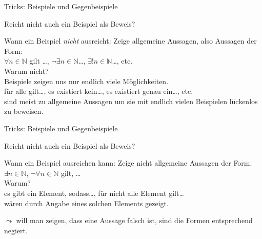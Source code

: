 \begin{frame}[fragile]{Tricks: Beispiele und Gegenbeispiele}
	\begin{alertblock}{Reicht nicht auch ein Beispiel als Beweis?}
	\end{alertblock}
	\begin{block}{Wann ein Beispiel \emph{nicht} ausreicht:}
		Zeige allgemeine Aussagen, also Aussagen der Form:\\$\forall n\in\mathbb{N}$ gilt \dots, $\neg\exists n\in\mathbb{N}$\dots, $\exists!n\in\mathbb{N}$\dots, etc.\\
		\alert{Warum nicht?}\\
		Beispiele zeigen uns nur endlich viele Möglichkeiten.\\
		\glqq für alle gilt\dots\grqq, \glqq es existiert kein\dots\grqq, \glqq es existiert genau ein\dots\grqq, etc. \\sind meist zu allgemeine Aussagen um sie mit endlich vielen Beispielen lückenlos zu beweisen.
	\end{block}
\end{frame}

\begin{frame}[fragile]{Tricks: Beispiele und Gegenbeispiele}
	\begin{alertblock}{Reicht nicht auch ein Beispiel als Beweis?}
	\end{alertblock}
	\begin{block}{Wann ein Beispiel ausreichen kann:}
		Zeige nicht allgemeine Aussagen der Form:\\
		$\exists n\in\mathbb{N}$, $\neg\forall n\in\mathbb{N}$ gilt, \dots\\
		\alert{Warum?}\\
		\glqq es gibt ein Element, sodass\dots\grqq, \glqq für nicht alle Element gilt\dots\grqq\\wären durch Angabe eines solchen Elements gezeigt.
	\end{block}
	$\leadsto$ will man zeigen, dass eine Aussage falsch ist, sind die Formen entsprechend negiert.
\end{frame}
